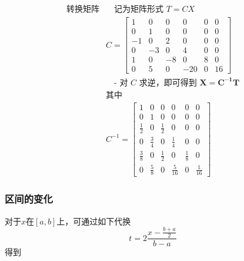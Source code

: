 \documentclass[UTF8,5pt,a4paper]{ctexart} %
\begin{document}
\begin{multicols}{4}
    \begin{equation*}
        \begin{aligned}
            \text{转换矩阵} & \quad \text{记为矩阵形式 } T = CX \\
            & C = \begin{bmatrix}
            1 & 0 & 0 & 0 & 0 & 0 \\
            0 & 1 & 0 & 0 & 0 & 0 \\
            -1 & 0 & 2 & 0 & 0 & 0 \\
            0 & -3 & 0 & 4 & 0 & 0 \\
            1 & 0 & -8 & 0 & 8 & 0 \\
            0 & 5 & 0 & -20 & 0 & 16
            \end{bmatrix}  \\
            & \quad \text{- 对 } C \text{ 求逆，即可得到 } \mathbf{X = C^{-1} T} \\
            & \text{其中 }\\
            & C^{-1} = \begin{bmatrix}
            1 & 0 & 0 & 0 & 0 & 0 \\
            0 & 1 & 0 & 0 & 0 & 0 \\
            \frac{1}{2} & 0 & \frac{1}{2} & 0 & 0 & 0 \\
            0 & \frac{3}{4} & 0 & \frac{1}{4} & 0 & 0 \\
            \frac{3}{8} & 0 & \frac{1}{2} & 0 & \frac{1}{8} & 0 \\
            0 & \frac{5}{8} & 0 & \frac{5}{16} & 0 & \frac{1}{16}
            \end{bmatrix} 
        \end{aligned}
    \end{equation*}
    \subsubsection{区间的变化}
对于$x$在$[a,b]$上，可通过如下代换
\begin{equation*}
t=2\frac{x-\frac{b+a}{2}}{b-a}
\end{equation*}
得到



\end{multicols}
\end{document}
